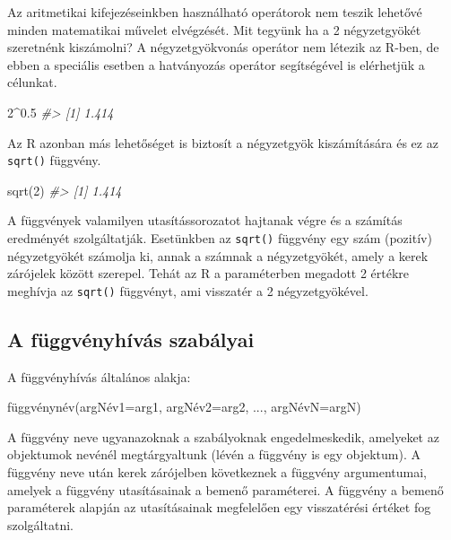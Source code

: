\documentclass[
]{book}
\newenvironment{Shaded}{\begin{snugshade}}{\end{snugshade}}
\newcommand{\CommentTok}[1]{\textcolor[rgb]{0.56,0.35,0.01}{\textit{#1}}}
\newcommand{\DecValTok}[1]{\textcolor[rgb]{0.00,0.00,0.81}{#1}}
\newcommand{\FloatTok}[1]{\textcolor[rgb]{0.00,0.00,0.81}{#1}}
\newcommand{\FunctionTok}[1]{\textcolor[rgb]{0.00,0.00,0.00}{#1}}
\newcommand{\NormalTok}[1]{#1}
\newcommand{\SpecialCharTok}[1]{\textcolor[rgb]{0.00,0.00,0.00}{#1}}
\begin{document}
Az aritmetikai kifejezéseinkben használható operátorok nem teszik lehetővé minden matematikai művelet elvégzését. Mit tegyünk ha a 2 négyzetgyökét szeretnénk kiszámolni? A négyzetgyökvonás operátor nem létezik az R-ben, de ebben a speciális esetben a hatványozás operátor segítségével is elérhetjük a célunkat.

\begin{Shaded}
\begin{Highlighting}[]
\DecValTok{2}\SpecialCharTok{\^{}}\FloatTok{0.5}
\CommentTok{\#\textgreater{} [1] 1.414}
\end{Highlighting}
\end{Shaded}

Az R azonban más lehetőséget is biztosít a négyzetgyök kiszámítására és ez az \texttt{sqrt()} függvény.

\begin{Shaded}
\begin{Highlighting}[]
\FunctionTok{sqrt}\NormalTok{(}\DecValTok{2}\NormalTok{)}
\CommentTok{\#\textgreater{} [1] 1.414}
\end{Highlighting}
\end{Shaded}

A függvények valamilyen utasítássorozatot hajtanak végre és a számítás eredményét szolgáltatják. Esetünkben az \texttt{sqrt()} függvény egy szám (pozitív) négyzetgyökét számolja ki, annak a számnak a négyzetgyökét, amely a kerek zárójelek között szerepel. Tehát az R a paraméterben megadott 2 értékre meghívja az \texttt{sqrt()} függvényt, ami visszatér a 2 négyzetgyökével.

\hypertarget{a-fuxfcggvuxe9nyhuxedvuxe1s-szabuxe1lyai}{%
\subsection{A függvényhívás szabályai}\label{a-fuxfcggvuxe9nyhuxedvuxe1s-szabuxe1lyai}}

A függvényhívás általános alakja:

\begin{Shaded}
\begin{Highlighting}[]
\NormalTok{függvénynév(argNév1=arg1, argNév2=arg2, ..., argNévN=argN)}
\end{Highlighting}
\end{Shaded}

A függvény neve ugyanazoknak a szabályoknak engedelmeskedik, amelyeket az objektumok nevénél megtárgyaltunk (lévén a függvény is egy objektum). A függvény neve után kerek zárójelben következnek a függvény argumentumai, amelyek a függvény utasításainak a bemenő paraméterei. A függvény a bemenő paraméterek alapján az utasításainak megfelelően egy visszatérési értéket fog szolgáltatni.
\end{document}
